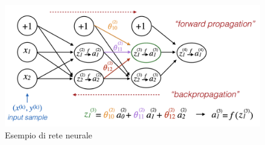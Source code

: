 \begin{figure}
    \centering
    \includegraphics[width=\textwidth]{immagini/neural_network.png}
    \caption{Esempio di rete neurale}
    \label{fig:neural_network}
\end{figure}

